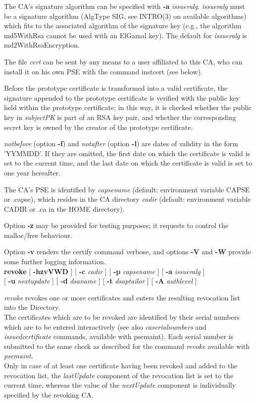 The CA's signature 
algorithm can be specified with {\bf -a} {\em issueralg}. {\em issueralg} must be a
signature algorithm (AlgType SIG, see INTRO(3) on available algorithms) which fits to the associated 
algorithm of the signature key (e.g., the algorithm md5WithRsa cannot be used with an ElGamal key).
The default for {\em issueralg} is md2WithRsaEncryption. 

The file {\em cert} can be sent by any means to a user affiliated to this
CA, who can install it on his own PSE with the command instcert (see below). 
 
Before the prototype certificate is transformed into a valid certificate, the signature appended to the prototype certificate is verified with the public key held within the prototype certificate; in this way, it is 
checked whether the public key in {\em subjectPK} is part of an RSA key pair, and whether the corresponding
secret key is owned by the creator of the prototype certificate.

{\em notbefore} (option {\bf -f}) and {\em notafter} (option {\bf -l}) are dates of validity in the 
form 'YYMMDD'. If they are omitted, the first date on which the certificate is valid is set to the current time, 
and the last date on which the certificate is valid is set to one year hereafter.
 
The CA's PSE is identified by {\em capsename} (default: environment variable CAPSE or .capse), which resides in the CA directory {\em cadir}
(default: environment variable CADIR or .ca in the HOME directory).
 
Option {\bf -z} may be provided for testing purposes; it requests to control the malloc/free behaviour.

Option {\bf -v} renders the certify command verbose, and options {\bf -V} and {\bf -W} provide 
some further logging information.
\\ [1em]

{\bf revoke} [ {\bf -hzvVWD} ] [ {\bf -c} {\em cadir} ] [ {\bf -p} {\em capsename} ] [ {\bf -a} {\em issueralg} ] \\
\hspace*{2cm} [ {\bf -u} {\em nextupdate} ] [ {\bf -d} {\em dsaname} ] [ {\bf -t} {\em dsaptailor} ] [ {\bf -A} {\em authlevel} ]
 
{\em revoke} revokes one or more certificates and enters the resulting revocation list into the 
Directory. \\
 
The certificates which are to be revoked are identified by their serial numbers which are to be
entered interactively (see also {\em caserialnumbers} and {\em issuedcertificate} commands, available
with psemaint). 
Each serial number is submitted to the same check as described for the command {\em revoke}
available with {\em psemaint}. \\
Only in case of at least one certificate having been revoked and added to the revocation list, the 
{\em lastUpdate} component of the revocation list is set to the current time, whereas the value 
of the {\em nextUpdate} component is individually specified by the revoking CA. 

